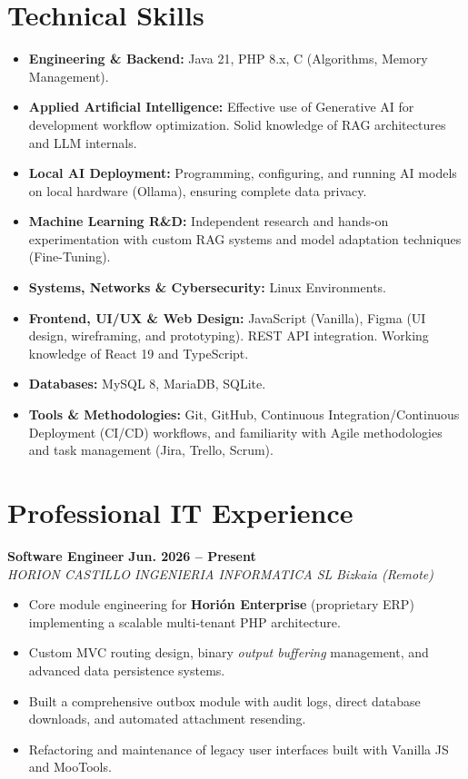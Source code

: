 \documentclass[a4paper,10pt]{article}
\newcommand{\jobheader}[4]{
    \noindent\textbf{#1} \hfill \textbf{#2} \\
    \textit{#3} \hfill \textit{#4} \vspace{3pt}
}
\begin{document}
\section{Technical Skills}
\begin{itemize}[leftmargin=0pt, label={}, itemsep=3pt, topsep=4pt]
    \item \textbf{Engineering \& Backend:} Java 21, PHP 8.x, C (Algorithms, Memory Management).
    \item \textbf{Applied Artificial Intelligence:} Effective use of Generative AI for development workflow optimization. Solid knowledge of RAG architectures and LLM internals.
    \item \textbf{Local AI Deployment:} Programming, configuring, and running AI models on local hardware (Ollama), ensuring complete data privacy.
    \item \textbf{Machine Learning R\&D:} Independent research and hands-on experimentation with custom RAG systems and model adaptation techniques (Fine-Tuning).
    \item \textbf{Systems, Networks \& Cybersecurity:} Linux Environments.
    \item \textbf{Frontend, UI/UX \& Web Design:} JavaScript (Vanilla), Figma (UI design, wireframing, and prototyping). REST API integration. Working knowledge of React 19 and TypeScript.
    \item \textbf{Databases:} MySQL 8, MariaDB, SQLite.
    \item \textbf{Tools \& Methodologies:} Git, GitHub, Continuous Integration/Continuous Deployment (CI/CD) workflows, and familiarity with Agile methodologies and task management (Jira, Trello, Scrum).
\end{itemize}

\section{Professional IT Experience}

\jobheader{Software Engineer}{Jun. 2026 -- Present}{HORION CASTILLO INGENIERIA INFORMATICA SL}{Bizkaia (Remote)}
\begin{itemize}[leftmargin=12pt, itemsep=3pt, topsep=4pt]
    \item Core module engineering for \textbf{Horión Enterprise} (proprietary ERP) implementing a scalable multi-tenant PHP architecture.
    \item Custom MVC routing design, binary \textit{output buffering} management, and advanced data persistence systems.
    \item Built a comprehensive outbox module with audit logs, direct database downloads, and automated attachment resending.
    \item Refactoring and maintenance of legacy user interfaces built with Vanilla JS and MooTools.
\end{itemize}
\end{document}

